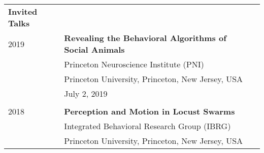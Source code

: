 \documentclass[letterpaper,10pt,oneside]{article}
\begin{document}
\begin{small}
\begin{longtable}{@{} l p{5.3in}l}
 \Large{\textbf{Invited Talks}}  \vspace{5mm} \\
 \large{2019}
 & \textbf{Revealing the Behavioral Algorithms of Social Animals} \\
 & Princeton Neuroscience Institute (PNI) \\
 & Princeton University, Princeton, New Jersey, USA \\
 & July 2, 2019 \\
 & \\
\large{2018}
& \textbf{Perception and Motion in Locust Swarms} \\
& Integrated Behavioral Research Group (IBRG) \\
& Princeton University, Princeton, New Jersey, USA \\

\end{longtable}
\end{small}
\end{document}
